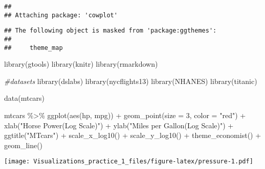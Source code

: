 \documentclass[
]{article}
\newenvironment{Shaded}{\begin{snugshade}}{\end{snugshade}}
\newcommand{\AttributeTok}[1]{\textcolor[rgb]{0.77,0.63,0.00}{#1}}
\newcommand{\CommentTok}[1]{\textcolor[rgb]{0.56,0.35,0.01}{\textit{#1}}}
\newcommand{\DecValTok}[1]{\textcolor[rgb]{0.00,0.00,0.81}{#1}}
\newcommand{\FunctionTok}[1]{\textcolor[rgb]{0.00,0.00,0.00}{#1}}
\newcommand{\NormalTok}[1]{#1}
\newcommand{\SpecialCharTok}[1]{\textcolor[rgb]{0.00,0.00,0.00}{#1}}
\newcommand{\StringTok}[1]{\textcolor[rgb]{0.31,0.60,0.02}{#1}}
\begin{document}
\begin{verbatim}
## 
## Attaching package: 'cowplot'
\end{verbatim}

\begin{verbatim}
## The following object is masked from 'package:ggthemes':
## 
##     theme_map
\end{verbatim}

\begin{Shaded}
\begin{Highlighting}[]
\FunctionTok{library}\NormalTok{(gtools)}
\FunctionTok{library}\NormalTok{(knitr)}
\FunctionTok{library}\NormalTok{(rmarkdown)}

\CommentTok{\#datasets}
\FunctionTok{library}\NormalTok{(dslabs)}
\FunctionTok{library}\NormalTok{(nycflights13)}
\FunctionTok{library}\NormalTok{(NHANES)}
\FunctionTok{library}\NormalTok{(titanic)}

\FunctionTok{data}\NormalTok{(mtcars)}

\NormalTok{mtcars }\SpecialCharTok{\%\textgreater{}\%} 
  \FunctionTok{ggplot}\NormalTok{(}\FunctionTok{aes}\NormalTok{(hp, mpg)) }\SpecialCharTok{+} \FunctionTok{geom\_point}\NormalTok{(}\AttributeTok{size =} \DecValTok{3}\NormalTok{, }\AttributeTok{color =} \StringTok{"red"}\NormalTok{) }\SpecialCharTok{+} 
  \FunctionTok{xlab}\NormalTok{(}\StringTok{"Horse Power(Log Scale)"}\NormalTok{) }\SpecialCharTok{+} \FunctionTok{ylab}\NormalTok{(}\StringTok{"Miles per Gallon(Log Scale)"}\NormalTok{) }\SpecialCharTok{+}
  \FunctionTok{ggtitle}\NormalTok{(}\StringTok{"MTcars"}\NormalTok{) }\SpecialCharTok{+} \FunctionTok{scale\_x\_log10}\NormalTok{() }\SpecialCharTok{+} \FunctionTok{scale\_y\_log10}\NormalTok{() }\SpecialCharTok{+}
  \FunctionTok{theme\_economist}\NormalTok{() }\SpecialCharTok{+} \FunctionTok{geom\_line}\NormalTok{()}
\end{Highlighting}
\end{Shaded}

\texttt{[image: Visualizations\_practice\_1\_files/figure-latex/pressure-1.pdf]}
\end{document}
